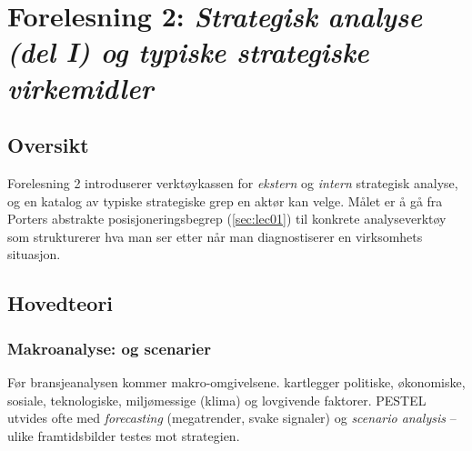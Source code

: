 \section{Forelesning 2: \emph{Strategisk analyse (del I) og typiske strategiske virkemidler}}
\label{sec:lec02}

\subsection*{Oversikt}
Forelesning 2 introduserer verktøykassen for \emph{ekstern} og \emph{intern}
strategisk analyse, og en katalog av typiske strategiske grep en aktør kan velge.
Målet er å gå fra Porters abstrakte posisjoneringsbegrep (\autoref{sec:lec01})
til konkrete analyseverktøy som strukturerer hva man ser etter når man
diagnostiserer en virksomhets situasjon.

\subsection{Hovedteori}

\subsubsection*{Makroanalyse:  og scenarier}
Før bransjeanalysen kommer makro-omgivelsene.  kartlegger
politiske, økonomiske, sosiale, teknologiske, miljømessige (klima) og
lovgivende faktorer. PESTEL utvides ofte med \emph{forecasting} (megatrender,
svake signaler) og \emph{scenario analysis} -- ulike framtidsbilder testes
mot strategien.

